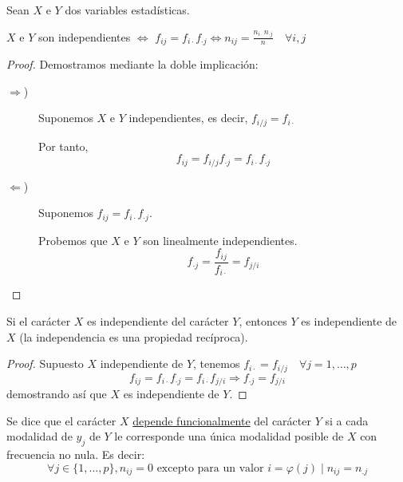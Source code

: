 \begin{teo}
Sean $X$ e $Y$ dos variables estadísticas.

\centering
$X$ e $Y$ son independientes $\Longleftrightarrow$ $f_{ij} = f_{i\cdot} f_{\cdot j} \Longleftrightarrow n_{ij} = \frac{n_{i\cdot} n_{\cdot j}}{n} \quad \forall i,j$
\end{teo}
\begin{proof} Demostramos mediante la doble implicación:
    \begin{description}
    \item [$\Longrightarrow$)] Suponemos $X$ e $Y$ independientes, es decir, $f_{i/j} = f_{i \cdot}$

    Por tanto,
    $$f_{ij} = f_{i/j}f_{\cdot j} = f_{i \cdot }f_{\cdot j}$$
    
    \item [$\Longleftarrow$)] Suponemos $f_{ij} = f_{i\cdot} f_{\cdot j}$.

    Probemos que $X$ e $Y$ son linealmente independientes.
    $$f_{\cdot j} = \frac{f_{ij}}{f_{i \cdot}} = f_{j/i}$$
    \end{description}
\end{proof}

\begin{prop}
    Si el carácter $X$ es independiente del carácter $Y$, entonces $Y$ es independiente de $X$ (la independencia es una propiedad recíproca).
\end{prop}
\begin{proof}
    Supuesto $X$ independiente de $Y$, tenemos $f_{i\cdot} = f_{i/j} \quad \forall j=1,\dots,p$
    \begin{equation*}
        f_{ij} = f_{i\cdot} f_{\cdot j} = f_{i\cdot}f_{j/i} \Longrightarrow f_{\cdot j} = f_{j/i}
    \end{equation*}
    demostrando así que $X$ es independiente de $Y$.
\end{proof}


Se dice que el carácter $X$ \underline{depende funcionalmente} del carácter $Y$ si a cada modalidad de $y_j$ de $Y$
le corresponde una única modalidad posible de $X$ con frecuencia no nula. Es decir:
$$\forall j \in \{1, \ldots, p\}, n_{ij} = 0 \text{ excepto para un valor } i = \varphi(j) \mid n_{ij} = n_{.j}$$

